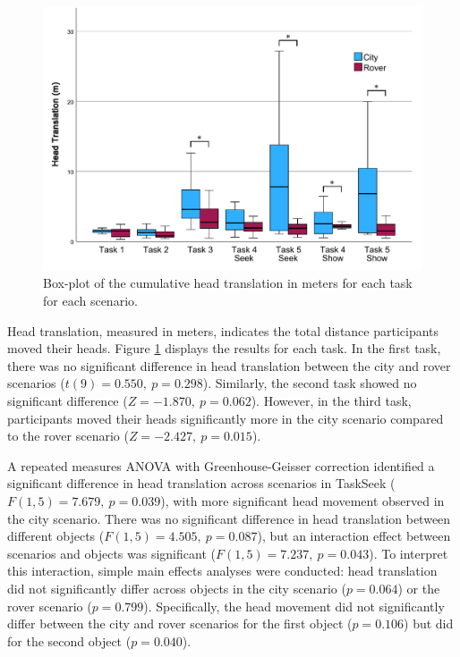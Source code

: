             \begin{figure}[h!]
                \centering
                \includegraphics[width=1\linewidth]{figures/head_graph.pdf}
                \caption{Box-plot of the cumulative head translation in meters for each task for each scenario.}
                \label{fig:task_time}
            \end{figure}

            Head translation, measured in meters, indicates the total distance participants moved their heads. Figure \ref{fig:task_time} displays the results for each task. In the first task, there was no significant difference in head translation between the city and rover scenarios ($t(9) = 0.550,\ p = 0.298$). Similarly, the second task showed no significant difference ($Z = -1.870,\ p = 0.062$). However, in the third task, participants moved their heads significantly more in the city scenario compared to the rover scenario ($Z = -2.427,\ p = 0.015$).

            A repeated measures ANOVA with Greenhouse-Geisser correction identified a significant difference in head translation across scenarios in TaskSeek ($F(1, 5) = 7.679,\ p = 0.039$), with more significant head movement observed in the city scenario. There was no significant difference in head translation between different objects ($F(1, 5) = 4.505,\ p = 0.087$), but an interaction effect between scenarios and objects was significant ($F(1, 5) = 7.237,\ p = 0.043$). To interpret this interaction, simple main effects analyses were conducted: head translation did not significantly differ across objects in the city scenario ($p = 0.064$) or the rover scenario ($p = 0.799$). Specifically, the head movement did not significantly differ between the city and rover scenarios for the first object ($p = 0.106$) but did for the second object ($p = 0.040$).

